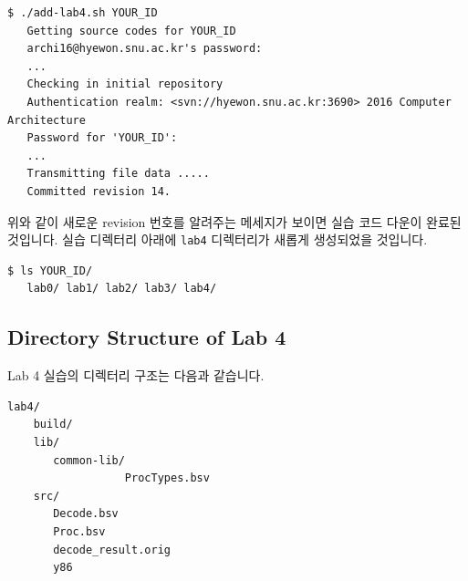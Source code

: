 \documentclass{article}
\begin{document}
\begin{Verbatim}[frame=single]
   $ ./add-lab4.sh YOUR_ID
   Getting source codes for YOUR_ID
   archi16@hyewon.snu.ac.kr's password: 
   ...
   Checking in initial repository
   Authentication realm: <svn://hyewon.snu.ac.kr:3690> 2016 Computer Architecture
   Password for 'YOUR_ID': 
   ...
   Transmitting file data .....
   Committed revision 14.
\end{Verbatim}

위와 같이 새로운 revision 번호를 알려주는 메세지가 보이면 실습 코드 다운이 완료된 것입니다. 
실습 디렉터리 아래에 \texttt{lab4} 디렉터리가 새롭게 생성되었을 것입니다.

\begin{Verbatim}[frame=single]
   $ ls YOUR_ID/
   lab0/ lab1/ lab2/ lab3/ lab4/
\end{Verbatim}

\subsection{Directory Structure of Lab 4}
Lab 4 실습의 디렉터리 구조는 다음과 같습니다.

\begin{Verbatim}[frame=single]
lab4/	
    build/
    lib/
       common-lib/
                  ProcTypes.bsv
    src/
       Decode.bsv
       Proc.bsv 
       decode_result.orig
       y86
\end{Verbatim}
\end{document}
